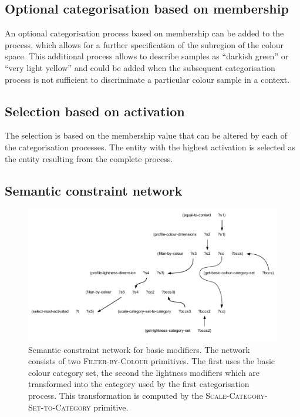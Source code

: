 \subsection{Optional categorisation based on membership}

An optional categorisation process based on membership can be added to
the process, which allows for a further specification of the subregion
of the colour space. This additional process allows to describe
samples as ``darkish green'' or ``very light yellow'' and could be
added when the subsequent categorisation process is not sufficient to
discriminate a particular colour sample in a context.

\subsection{Selection based on activation}

The selection is based on the membership value that can be altered by
each of the categorisation processes. The entity with the highest
activation is selected as the entity resulting from the complete
process.

\subsection{Semantic constraint network}

\begin{figure}[b]
  \centering
  \includegraphics[width=\textwidth]{./achromatic/figures/semantic-program.pdf}
  \caption[Semantic constraint network for basic
  modifiers]{Semantic constraint network for basic modifiers. The
    network consists of two \textsc{Filter-by-Colour} primitives. The
    first uses the basic colour category set, the second the
    lightness modifiers which are transformed into the category used
    by the first categorisation process. This transformation is
    computed by the \textsc{Scale-Category-Set-to-Category}
    primitive.}
  \label{f:ams-semantic-structure}
\end{figure}

